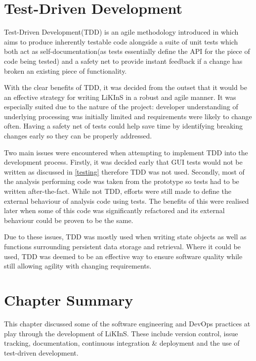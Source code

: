 \documentclass{l4proj}
\begin{document}
\section{Test-Driven Development}
Test-Driven Development(TDD) is an agile methodology introduced in \citep{kentbeck} which aims to produce inherently testable code alongside a suite of unit tests which both act as self-documentation(as tests essentially define the API for the piece of code being tested) and a safety net to provide instant feedback if a change has broken an existing piece of functionality.

With the clear benefits of TDD, it was decided from the outset that it would be an effective strategy for writing LiKInS in a robust and agile manner. It was especially suited due to the nature of the project: developer understanding of underlying processing was initially limited and requirements were likely to change often. Having a safety net of tests could help save time by identifying breaking changes early so they can be properly addressed.

Two main issues were encountered when attempting to implement TDD into the development process. Firstly, it was decided early that GUI tests would not be written as discussed in \ref{testing} therefore TDD was not used. Secondly, most of the analysis performing code was taken from the prototype so tests had to be written after-the-fact. While not TDD, efforts were still made to define the external behaviour of analysis code using tests. The benefits of this were realised later when some of this code was significantly refactored and its external behaviour could be proven to be the same.

Due to these issues, TDD was mostly used when writing state objects as well as functions surrounding persistent data storage and retrieval. Where it could be used, TDD was deemed to be an effective way to ensure software quality while still allowing agility with changing requirements.

\section{Chapter Summary}
This chapter discussed some of the software engineering and DevOps practices at play through the development of LiKInS. These include version control, issue tracking, documentation, continuous integration \& deployment and the use of test-driven development.

\end{document}
